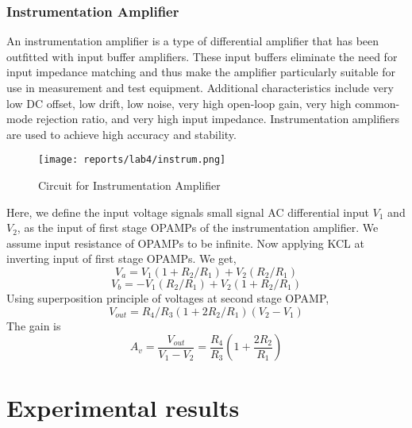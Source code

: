 \documentclass[12pt]{article}
\begin{document}
        \subsubsection{Instrumentation Amplifier}
            An instrumentation amplifier is a type of differential amplifier that has been outfitted with input buffer amplifiers. These input buffers eliminate the need for input impedance matching and thus make the amplifier particularly suitable for use in measurement and test equipment. Additional characteristics include very low DC offset, low drift, low noise, very high open-loop gain, very high common-mode rejection ratio, and very high input impedance. Instrumentation amplifiers are used to achieve high accuracy and stability.
            \\
            \begin{figure}[H]
              \centering
              \texttt{[image: reports/lab4/instrum.png]}
              \caption{Circuit for Instrumentation Amplifier}
              \label{fig:instru}
            \end{figure}
            \noindent
            Here, we define the input voltage signals small signal AC differential input $V_1$ and $V_2$, as the input of first stage OPAMPs of the instrumentation amplifier. We assume input resistance of OPAMPs to be infinite. Now applying KCL at inverting input of first stage OPAMPs. We get,
            \begin{equation}
                V_a = V_1(1 + R_2/R_1) + V_2(R_2/R_1)
            \end{equation}
            \begin{equation}
                V_b = - V_1(R_2/R_1) + V_2(1 + R_2/R_1)
            \end{equation}
            Using superposition principle of voltages at second stage OPAMP,
            \begin{equation}
                V_{out} = R_4/R_3(1 + 2R_2/R_1)(V_2 - V_1)
            \end{equation}
            The gain is
            \begin{equation}
                A_v = \frac{V_{out}}{V_1 - V_2} = \frac{R_4}{R_3}(1 + \frac{2R_2}{R_1})
            \end{equation}
            
    
\newpage
\section{Experimental results}
\end{document}
